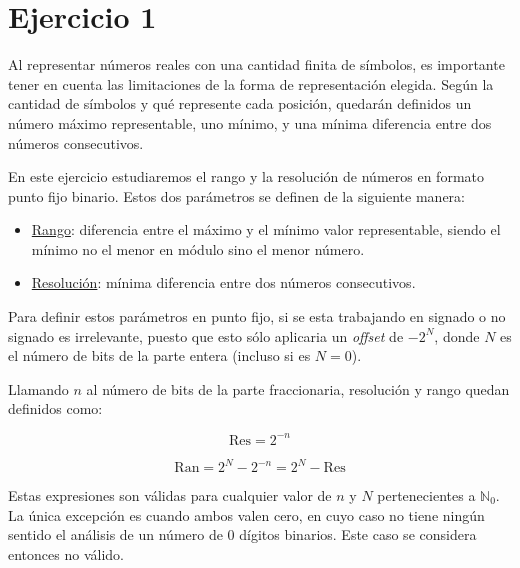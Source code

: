 \documentclass[../../../informe/src/main.tex]{subfiles}
\begin{document}
\section{Ejercicio 1}

Al representar n\'umeros reales con una cantidad finita de s\'imbolos, es importante tener en cuenta las limitaciones de la forma de representaci\'on elegida. Seg\'un la cantidad de s\'imbolos y qu\'e represente cada posici\'on, quedar\'an definidos un n\'umero m\'aximo representable, uno m\'inimo, y una m\'inima diferencia entre dos n\'umeros consecutivos.\par

En este ejercicio estudiaremos el rango y la resoluci\'on de n\'umeros en formato punto fijo binario. Estos dos par\'ametros se definen de la siguiente manera: \par

\begin{itemize}
	\item \underline{Rango}: diferencia entre el m\'aximo y el m\'inimo valor representable, siendo el m\'inimo no el menor en m\'odulo sino el menor n\'umero.
	\item \underline{Resoluci\'on}: m\'inima diferencia entre dos n\'umeros consecutivos.
\end{itemize}

Para definir estos par\'ametros en punto fijo, si se esta trabajando en signado o no signado es irrelevante, puesto que esto s\'olo aplicaria un \textit{offset} de $-2^N$, donde $N$ es el n\'umero de bits de la parte entera (incluso si es $N=0$). \par

Llamando $n$ al n\'umero de bits de la parte fraccionaria, resoluci\'on y rango quedan definidos como:\par

\begin{equation} 
	\label{eq: ej1-res} 
	\mathrm{Res} = 2^{-n} 
\end{equation}

\begin{equation} 
	\label{eq: ej1-ran}  
	\mathrm{Ran} = 2^N - 2^{-n} = 2^N - \mathrm{Res}
\end{equation}

Estas expresiones son v\'alidas para cualquier valor de $n$ y $N$ pertenecientes a $\mathbb{N}_0$. La \'unica excepci\'on es cuando ambos valen cero, en cuyo caso no tiene ning\'un sentido el an\'alisis de un n\'umero de 0 d\'igitos binarios. Este caso se considera entonces no v\'alido.\par
\end{document}
